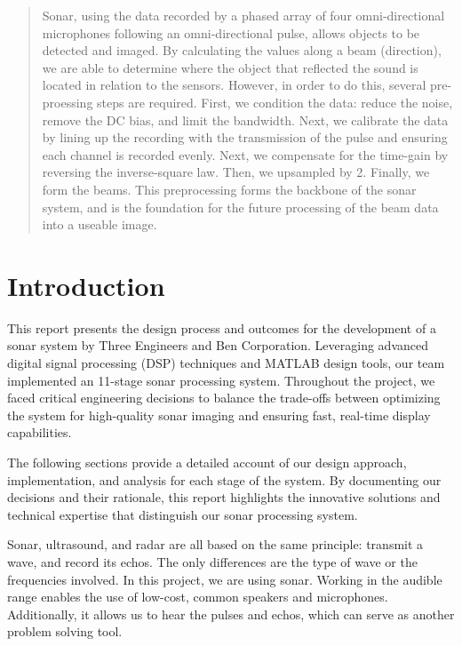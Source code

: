 



\begin{abstract}

Sonar, using the data recorded by a phased array of four omni-directional microphones following an omni-directional pulse, allows objects to be detected and imaged.  By calculating the values along a beam (direction), we are able to determine where the object that reflected the sound is located in relation to the sensors.  However, in order to do this, several pre-proessing steps are required.  First, we condition the data: reduce the noise, remove the DC bias, and limit the bandwidth.  Next, we calibrate the data by lining up the recording with the transmission of the pulse and ensuring each channel is recorded evenly.  Next, we compensate for the time-gain by reversing the inverse-square law.  Then, we upsampled by 2.  Finally, we form the beams.  This preprocessing forms the backbone of the sonar system, and is the foundation for the future processing of the beam data into a useable image.


\end{abstract}

\section{Introduction}

This report presents the design process and outcomes for the development of a sonar system by Three Engineers and Ben Corporation. Leveraging advanced digital signal processing (DSP) techniques and MATLAB design tools, our team implemented an 11-stage sonar processing system. Throughout the project, we faced critical engineering decisions to balance the trade-offs between optimizing the system for high-quality sonar imaging and ensuring fast, real-time display capabilities.

The following sections provide a detailed account of our design approach, implementation, and analysis for each stage of the system. By documenting our decisions and their rationale, this report highlights the innovative solutions and technical expertise that distinguish our sonar processing system.

Sonar, ultrasound, and radar are all based on the same principle: transmit a wave, and record its echos.  The only differences are the type of wave or the frequencies involved.  In this project, we are using sonar.  Working in the audible range enables the use of low-cost, common speakers and microphones.  Additionally, it allows us to hear the pulses and echos, which can serve as another problem solving tool.

